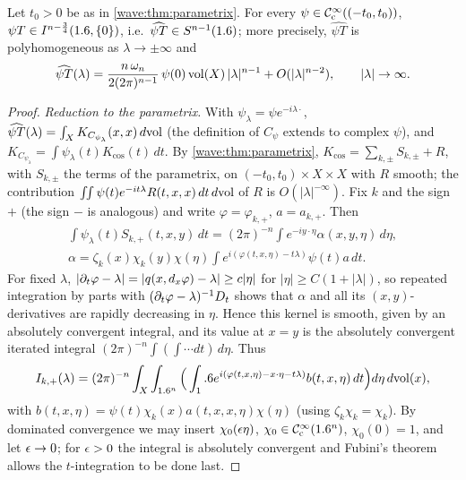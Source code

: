 \begin{theorem}\label{wave:thm:trace}
Let $t_0>0$ be as in \cref{wave:thm:parametrix}. For every $\psi\in\mathcal{C}^\infty_{\mathrm{c}}((-t_0,t_0))$,
$\psi T\in I^{n-\frac34}(1.6,\{0\})$, i.e.\ $\widehat{\psi T}\in S^{n-1}(1.6)$; more precisely,
$\widehat{\psi T}$ is polyhomogeneous as $\lambda\to\pm\infty$ and
\begin{equation}\label{wave:eq:trace-leading}
\widehat{\psi T}(\lambda)=\frac{n\,\omega_n}{2(2\pi)^{n-1}}\,\psi(0)\operatorname{vol}(X)\,|\lambda|^{n-1}+O(|\lambda|^{n-2}),\qquad|\lambda|\to\infty .
\end{equation}
\end{theorem}
\begin{proof}
\emph{Reduction to the parametrix.} With $\psi_\lambda=\psi e^{-i\lambda\cdot}$,
$\widehat{\psi T}(\lambda)=\int_XK_{C_{\psi_\lambda}}(x,x)\,d\mathrm{vol}$ (the definition of $C_\psi$
extends to complex $\psi$), and $K_{C_{\psi_\lambda}}=\int\psi_\lambda(t)K_{\cos}(t)\,dt$. By
\cref{wave:thm:parametrix}, $K_{\cos}=\sum_{k,\pm}S_{k,\pm}+R$, with $S_{k,\pm}$ the terms of the parametrix, on
$(-t_0,t_0)\times X\times X$ with $R$ smooth; the contribution
$\iint\psi(t)e^{-it\lambda}R(t,x,x)\,dt\,d\mathrm{vol}$ of $R$ is $O(|\lambda|^{-\infty})$. Fix $k$ and
the sign $+$ (the sign $-$ is analogous) and write $\varphi=\varphi_{k,+}$,
$a=a_{k,+}$. Then
\begin{gather*}
\int\psi_\lambda(t)S_{k,+}(t,x,y)\,dt=(2\pi)^{-n}\int e^{-iy\cdot\eta}\alpha(x,y,\eta)\,d\eta,\\
\alpha=\zeta_k(x)\chi_k(y)\chi(\eta)\int e^{i(\varphi(t,x,\eta)-t\lambda)}\psi(t)a\,dt .
\end{gather*}
For fixed $\lambda$, $|\partial_t\varphi-\lambda|=|q(x,d_x\varphi)-\lambda|\ge c|\eta|$ for $|\eta|\ge C(1+|\lambda|)$, so
repeated integration by parts with $(\partial_t\varphi-\lambda)^{-1}D_t$ shows that $\alpha$ and all its
$(x,y)$-derivatives are rapidly decreasing in $\eta$. Hence this kernel is smooth, given
by an absolutely convergent integral, and its value at $x=y$ is the absolutely
convergent iterated integral $(2\pi)^{-n}\int(\int\cdots dt)\,d\eta$. Thus
\begin{equation*}
I_{k,+}(\lambda)=(2\pi)^{-n}\int_X\int_{1.6^n}\Big(\int_1.6 e^{i(\varphi(t,x,\eta)-x\cdot\eta-t\lambda)}b(t,x,\eta)\,dt\Big)d\eta\,d\mathrm{vol}(x),
\end{equation*}
with $b(t,x,\eta)=\psi(t)\chi_k(x)a(t,x,x,\eta)\chi(\eta)$ (using $\zeta_k\chi_k=\chi_k$). By
dominated convergence we may insert $\chi_0(\epsilon\eta)$, $\chi_0\in\mathcal{C}^\infty_{\mathrm{c}}(1.6^n)$, $\chi_0(0)=1$,
and let $\epsilon\to0$; for $\epsilon>0$ the integral is absolutely convergent and Fubini's
theorem allows the $t$-integration to be done last.


\end{proof}
